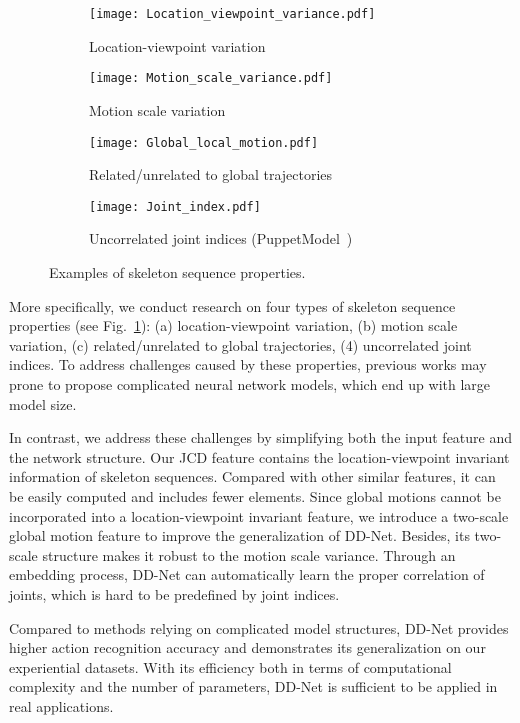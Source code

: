 \documentclass[journal]{IEEEtran}
\begin{document}
\begin{figure}[ht!]
\centering
\begin{subfigure}[t]{.9\linewidth}
  {\texttt{[image: Location\_viewpoint\_variance.pdf]}}
   \caption{Location-viewpoint variation} 
\end{subfigure}
\begin{subfigure}[t]{.9\linewidth}
  {\texttt{[image: Motion\_scale\_variance.pdf]}}
   \caption{Motion scale variation} 
\end{subfigure}
\begin{subfigure}[t]{.9\linewidth}
  {\texttt{[image: Global\_local\_motion.pdf]}}
   \caption{Related/unrelated to global trajectories} 
\end{subfigure}
\begin{subfigure}[t]{.9\linewidth}
  {\texttt{[image: Joint\_index.pdf]}}
   \caption{Uncorrelated joint indices (PuppetModel~\cite{Jhuang:ICCV:2013})} 
\end{subfigure}
   \caption{Examples of skeleton sequence properties.}\label{fig:properties}
\end{figure} 


More specifically, we conduct research on four types of skeleton sequence properties (see Fig.~\textcolor{red}{\ref{fig:properties}}): (a) location-viewpoint variation, (b) motion scale variation, (c) related/unrelated to global trajectories, (4) uncorrelated joint indices. To address challenges caused by these properties, previous works may prone to propose complicated neural network models, which end up with large model size. 

In contrast, we address these challenges by simplifying both the input feature and the network structure. Our JCD feature contains the location-viewpoint invariant information of skeleton sequences. Compared with other similar features, it can be easily computed and includes fewer elements. Since global motions cannot be incorporated into a location-viewpoint invariant feature, we introduce a two-scale global motion feature to improve the generalization of DD-Net. Besides, its two-scale structure makes it robust to the motion scale variance. Through an embedding process, DD-Net can automatically learn the proper correlation of joints, which is hard to be predefined by joint indices. 

Compared to methods relying on complicated model structures, DD-Net provides higher action recognition accuracy and demonstrates its generalization on our experiential datasets. With its efficiency both in terms of computational complexity and the number of parameters, DD-Net is sufficient to be applied in real applications.
\end{document}
